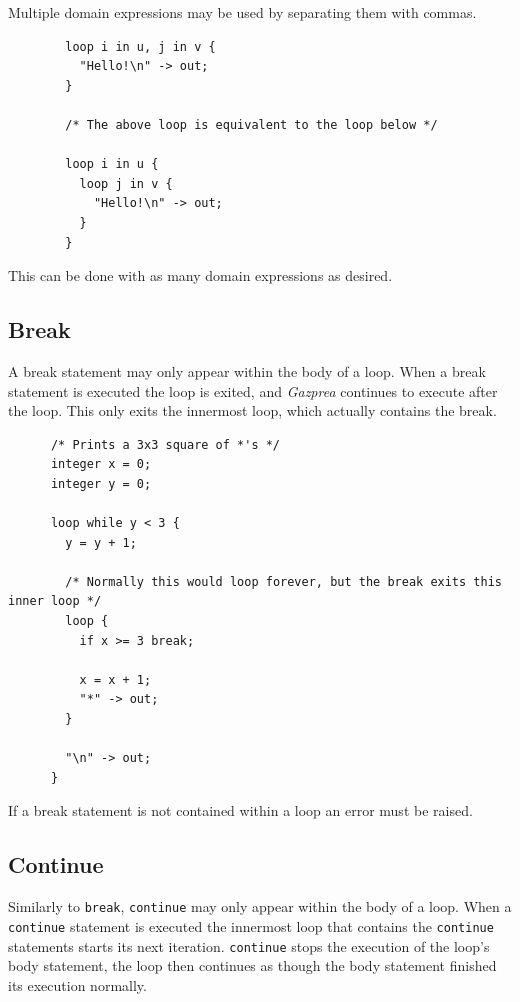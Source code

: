 \documentclass{article}
\begin{document}
      Multiple domain expressions may be used by separating them with commas.

      \begin{lstlisting}
        loop i in u, j in v {
          "Hello!\n" -> out;
        }

        /* The above loop is equivalent to the loop below */

        loop i in u {
          loop j in v {
            "Hello!\n" -> out;
          }
        }
      \end{lstlisting}

      This can be done with as many domain expressions as desired.


  \subsection{Break}\label{sec:break}

    A break statement may only appear within the body of a loop. When a break statement is executed the loop is
    exited, and \textit{Gazprea} continues to execute after the loop. This only exits the innermost loop, which
    actually contains the break.

    \begin{lstlisting}
      /* Prints a 3x3 square of *'s */
      integer x = 0;
      integer y = 0;

      loop while y < 3 {
        y = y + 1;

        /* Normally this would loop forever, but the break exits this inner loop */
        loop {
          if x >= 3 break;

          x = x + 1;
          "*" -> out;
        }

        "\n" -> out;
      }
    \end{lstlisting}

    If a break statement is not contained within a loop an error must be raised.

  \subsection{Continue}\label{sec:continue}


    Similarly to \texttt{break}, \texttt{continue} may only appear within the body of a loop. When a
    \texttt{continue} statement is executed the innermost loop that contains the \texttt{continue} statements starts
    its next iteration.  \texttt{continue} stops the execution of the loop's body statement, the loop then continues
    as though the body statement finished its execution normally.
\end{document}
